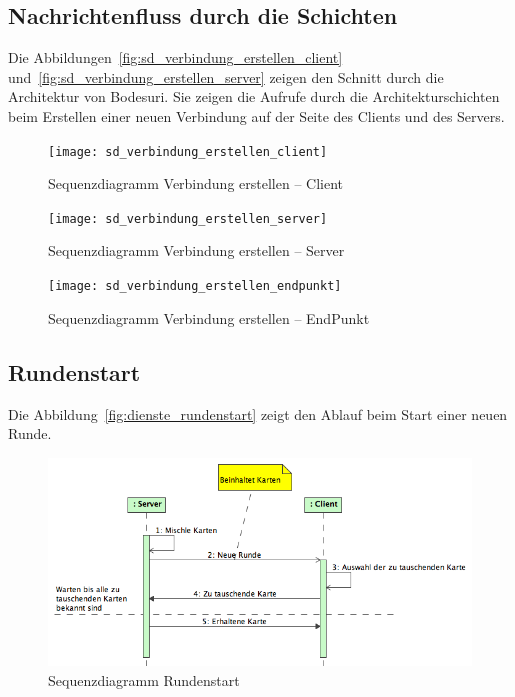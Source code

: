 \documentclass[12pt,halfparskip]{scrartcl}
\begin{document}
\subsection{Nachrichtenfluss durch die Schichten} %
\label{sub:nachrichtenfluss_durch_die_schichten}
Die Abbildungen~\vref{fig:sd_verbindung_erstellen_client} und~\vref{fig:sd_verbindung_erstellen_server} zeigen den Schnitt durch die Architektur von Bodesuri. Sie zeigen die Aufrufe durch die Architekturschichten beim Erstellen einer neuen Verbindung auf der Seite des Clients und des Servers.
\begin{figure}[h]
	\centering
	\texttt{[image: sd\_verbindung\_erstellen\_client]}
	\caption{Sequenzdiagramm Verbindung erstellen -- Client}
	\label{fig:sd_verbindung_erstellen_client}
\end{figure}
\begin{figure}[h]
	\centering
	\texttt{[image: sd\_verbindung\_erstellen\_server]}
	\caption{Sequenzdiagramm Verbindung erstellen -- Server}
	\label{fig:sd_verbindung_erstellen_server}
\end{figure}

\begin{figure}[h]
	\centering
	\texttt{[image: sd\_verbindung\_erstellen\_endpunkt]}
	\caption{Sequenzdiagramm Verbindung erstellen -- EndPunkt}
	\label{fig:sd_verbindung_erstellen_endpunkt}
\end{figure}


\subsection{Rundenstart} %
\label{sub:rundenstart}
Die Abbildung~\vref{fig:dienste_rundenstart} zeigt den Ablauf beim Start einer neuen Runde.
\begin{figure}[h]
	\centering
	\includegraphics[width=0.7 \textwidth]{dienste_rundenstart}
	\caption{Sequenzdiagramm Rundenstart}
	\label{fig:dienste_rundenstart}
\end{figure}
\end{document}
